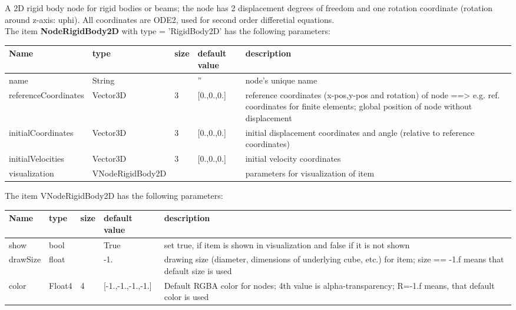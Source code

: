 A 2D rigid body node for rigid bodies or beams; the node has 2 displacement degrees of freedom and one rotation coordinate (rotation around z-axis: uphi). All coordinates are ODE2, used for second order differetial equations.
 \\\vspace{12pt} \noindent The item {\bf NodeRigidBody2D} with type = 'RigidBody2D' has the following parameters:\vspace{-1cm}\\ 
\begin{center}
  \footnotesize
  \begin{longtable}{| p{4.5cm} | p{2.5cm} | p{0.5cm} | p{2.5cm} | p{6cm} |}
    \hline
    \bf Name & \bf type & \bf size & \bf default value & \bf description \\ \hline
    name &     String &      &     '' &     node's unique name\\ \hline
    referenceCoordinates &     Vector3D &     3 &     [0.,0.,0.] &     reference coordinates (x-pos,y-pos and rotation) of node ==> e.g. ref. coordinates for finite elements; global position of node without displacement\\ \hline
    initialCoordinates &     Vector3D &     3 &     [0.,0.,0.] &     initial displacement coordinates and angle (relative to reference coordinates)\\ \hline
    initialVelocities &     Vector3D &     3 &     [0.,0.,0.] &     initial velocity coordinates\\ \hline
    visualization & VNodeRigidBody2D & & & parameters for visualization of item \\ \hline
	  \end{longtable}
	\end{center}
The item VNodeRigidBody2D has the following parameters:\vspace{-1cm}\\ 
\begin{center}
  \footnotesize
  \begin{longtable}{| p{4.5cm} | p{2.5cm} | p{0.5cm} | p{2.5cm} | p{6cm} |}
    \hline
    \bf Name & \bf type & \bf size & \bf default value & \bf description \\ \hline
    show &     bool &      &     True &     set true, if item is shown in visualization and false if it is not shown\\ \hline
    drawSize &     float &      &     -1. &     drawing size (diameter, dimensions of underlying cube, etc.)  for item; size == -1.f means that default size is used\\ \hline
    color &     Float4 &     4 &     [-1.,-1.,-1.,-1.] &     Default RGBA color for nodes; 4th value is alpha-transparency; R=-1.f means, that default color is used\\ \hline
	  \end{longtable}
	\end{center}

